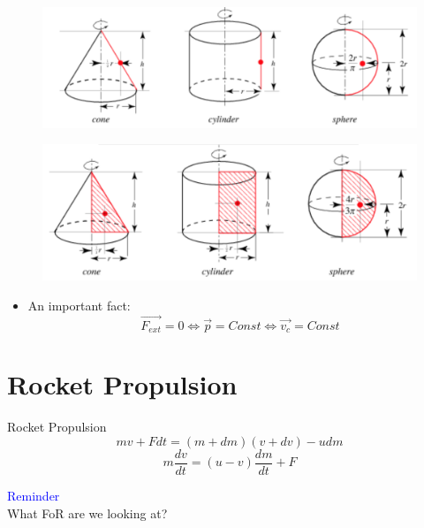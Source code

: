 \documentclass{beamer}
\begin{document}
\begin{frame}
  \begin{figure}[H]
    \centering
    \includegraphics[width=0.6 \linewidth, angle =0]{example3.png}
    \label{fig:6}
    \end{figure}
    \begin{figure}[htbp]
    \centering
    \includegraphics[width=0.6 \linewidth, angle =0]{example2.png}
    \label{fig:7}
    \end{figure}\pause
    \begin{itemize}
      \item An important fact: $$\vec{F_{ext}} = 0 \Leftrightarrow \vec{p} = Const \Leftrightarrow \vec{v_c} = Const$$
    \end{itemize}
\end{frame}

\section{Rocket Propulsion}
\begin{frame}
  \begin{block}{Rocket Propulsion}
    $$mv + Fdt = (m+dm)(v+dv)-udm$$
    $$m\frac{dv}{dt} = (u-v)\frac{dm}{dt}+ F$$
    \end{block}
    \textcolor{blue}{Reminder}\\
    What FoR are we looking at?
\end{frame}
\end{document}
